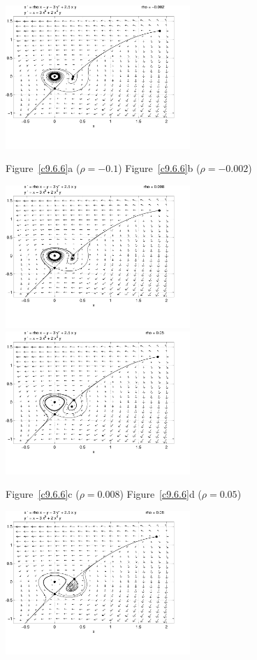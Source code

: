 \documentclass{ximera}
\begin{document}
\begin{computerExercise}
\begin{solution}
\begin{figure}[htb]
{     \includegraphics[width=2.75in]{exfigure/pr3-M002.pdf}}
     \centerline{Figure~\ref{c9.6.6}a ($\rho = -0.1$)\hspace{1.3in} Figure~\ref{c9.6.6}b ($\rho = -0.002$)}
\end{figure}
\begin{figure}[htb]
     \centerline{%
     \includegraphics[width=2.75in]{exfigure/pr3-008.pdf}
     \includegraphics[width=2.75in]{exfigure/pr3-05.pdf}}
     \centerline{Figure~\ref{c9.6.6}c ($\rho = 0.008$)\hspace{1.3in} Figure~\ref{c9.6.6}d ($\rho = 0.05$)}
\end{figure}
\begin{figure}[htb]
     \centerline{%
     \includegraphics[width=2.75in]{exfigure/pr3-08.pdf}   
}
\end{figure}
\end{solution}
\end{computerExercise}
\end{document}
